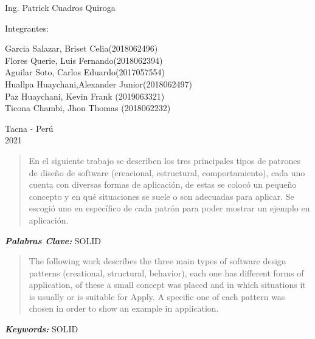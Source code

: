 \documentclass{article}
\providecommand{\keywords}[1]{
  \small	
  \textbf{\textit{\quad \quad Keywords: }} #1}
\providecommand{\pclave}[1]{
  \small	
  \textbf{\textit{\quad \quad Palabras Clave: }} #1}
\begin{document}
\begin{titlepage}
\begin{center}
\vspace*{0.1in}
\begin{large}
 Ing. Patrick Cuadros Quiroga\\
\end{large}

\vspace*{0.2in}
\vspace*{0.1in}
\begin{large}

Integrantes: \\
\begin{flushleft}
Garcia Salazar, Briset Celia\hfill(2018062496) \\
Flores Querie, Luis Fernando\hfill(2018062394)\\
Aguilar Soto, Carlos Eduardo\hfill(2017057554)\\
Huallpa Huaychani,Alexander Junior\hfill(2018062497)\\
Paz Huaychani, Kevin Frank \hfill(2019063321)\\
Ticona Chambi, Jhon Thomas \hfill(2018062232)\\

\end{flushleft}
\end{large}

\vspace*{0.1in}
\begin{large}
Tacna - Perú\\
2021
\end{large}
\end{center}
\end{titlepage}

\begin{abstract}
\quad En el siguiente trabajo se describen los tres principales tipos de patrones de diseño de software (creacional, estructural, comportamiento), cada uno cuenta con diversas formas de aplicación, de estas se colocó un pequeño concepto y en qué situaciones se suele o son adecuadas para aplicar.
Se escogió uno en específico de cada patrón para poder mostrar un ejemplo en aplicación.
\end{abstract}
\pclave{SOLID}

\begin{abstract}
\quad The following work describes the three main types of software design patterns (creational, structural, behavior), each one has different forms of application, of these a small concept was placed and in which situations it is usually or is suitable for Apply.
A specific one of each pattern was chosen in order to show an example in application.
\end{abstract}
\keywords{SOLID} 
\end{document}

